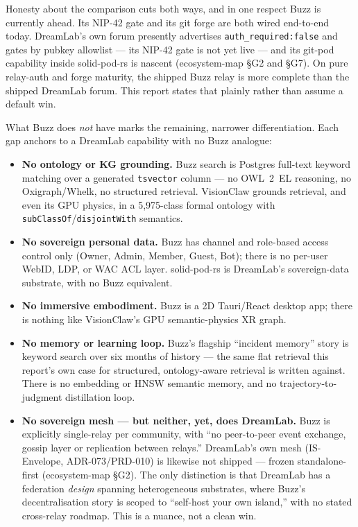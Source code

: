 Honesty about the comparison cuts both ways, and in one respect Buzz is currently ahead. Its NIP-42 gate and its git forge are both wired end-to-end today. DreamLab's own forum presently advertises \texttt{auth\_required:false} and gates by pubkey allowlist --- its NIP-42 gate is not yet live --- and its git-pod capability inside solid-pod-rs is nascent (ecosystem-map \S G2 and \S G7). On pure relay-auth and forge maturity, the shipped Buzz relay is more complete than the shipped DreamLab forum. This report states that plainly rather than assume a default win.

What Buzz does \emph{not} have marks the remaining, narrower differentiation. Each gap anchors to a DreamLab capability with no Buzz analogue:

\begin{itemize}
  \item \textbf{No ontology or KG grounding.} Buzz search is Postgres full-text keyword matching over a generated \texttt{tsvector} column --- no OWL~2~EL reasoning, no Oxigraph/Whelk, no structured retrieval. VisionClaw grounds retrieval, and even its GPU physics, in a 5,975-class formal ontology with \texttt{subClassOf}/\texttt{disjointWith} semantics.
  \item \textbf{No sovereign personal data.} Buzz has channel and role-based access control only (Owner, Admin, Member, Guest, Bot); there is no per-user WebID, LDP, or WAC ACL layer. solid-pod-rs is DreamLab's sovereign-data substrate, with no Buzz equivalent.
  \item \textbf{No immersive embodiment.} Buzz is a 2D Tauri/React desktop app; there is nothing like VisionClaw's GPU semantic-physics XR graph.
  \item \textbf{No memory or learning loop.} Buzz's flagship ``incident memory'' story is keyword search over six months of history --- the same flat retrieval this report's own case for structured, ontology-aware retrieval is written against. There is no embedding or HNSW semantic memory, and no trajectory-to-judgment distillation loop.
  \item \textbf{No sovereign mesh --- but neither, yet, does DreamLab.} Buzz is explicitly single-relay per community, with ``no peer-to-peer event exchange, gossip layer or replication between relays.'' DreamLab's own mesh (IS-Envelope, ADR-073/PRD-010) is likewise not shipped --- frozen standalone-first (ecosystem-map \S G2). The only distinction is that DreamLab has a federation \emph{design} spanning heterogeneous substrates, where Buzz's decentralisation story is scoped to ``self-host your own island,'' with no stated cross-relay roadmap. This is a nuance, not a clean win.
\end{itemize}


